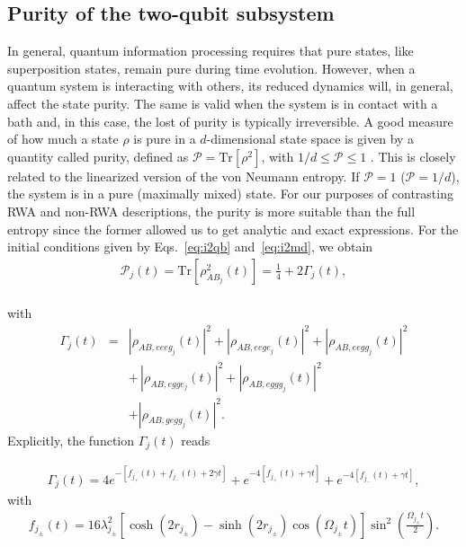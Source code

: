 \documentclass[%
reprint,
amsmath,amssymb,
aps,
pra,
]{revtex4-1}
\begin{document}
\subsection{\label{subsec:pur}Purity of the two-qubit subsystem}
In general, quantum information processing requires that pure states, like superposition states, remain pure during time evolution. However, when a quantum system is interacting with others, its reduced dynamics will, in general, affect the state purity. The same is valid when the system is in contact with a bath and, in this case, the lost of purity is typically irreversible.  A good measure of how much a state $\rho$ is pure in a $d$-dimensional  state space is given by a quantity called purity, defined as $\mathcal{P}=\text{Tr}\left[\rho^2\right]$, with $1/d\leq\mathcal{P}\leq1$ \cite{bar09}. This is closely related to the linearized version of the von Neumann entropy.  If $\mathcal{P}=1$ ($\mathcal{P}=1/d$), the system is in a pure (maximally mixed) state. For our purposes of contrasting RWA and non-RWA descriptions, the purity is more suitable than the full entropy since the former allowed us to get analytic and exact expressions. For the initial conditions given by Eqs.~\eqref{eq:i2qb} and~\eqref{eq:i2md}, we obtain 
\begin{eqnarray}
\mathcal{P}_{j}(t)=\text{Tr}\left[\rho_{AB_j}^2(t)\right]=\frac{1}{4}+2\Gamma_{j}(t),
\label{eq:purAB}
\end{eqnarray}\\
with 
\begin{eqnarray}
\Gamma_{j}(t)&=&\left|\rho_{AB,eeeg_j}(t)\right|^2+\left|\rho_{AB,eege_j}(t)\right|^2+\left|\rho_{AB,eegg_j}(t)\right|^2 \nonumber \\
&&+\,\left|\rho_{AB,egge_j}(t)\right|^2+\left|\rho_{AB,eggg_j}(t)\right|^2\nonumber\\ &&+\left|\rho_{AB,gegg_j}(t)\right|^2.
\label{eq:Gamma}
\end{eqnarray}
Explicitly, the function $\Gamma_{j}(t)$ reads 
\begin{widetext}
\begin{eqnarray}
\Gamma_{j}(t)=4e^{-\left[f_{j_+}(t)+f_{j_-}(t)+2\gamma t\right]}+e^{-4\left[f_{j_+}(t)+\gamma t\right]}+e^{-4\left[f_{j_-}(t)+\gamma t\right]},
\label{eq:Gamma1}
\end{eqnarray}
with
\begin{eqnarray}
f_{j_\pm}(t)=16\lambda_{j_\pm}^2\left[\cosh(2r_{j_\pm})-\sinh(2r_{j_\pm})\cos(\Omega_{j_\pm} t)\right]\sin ^2\left(\frac{\Omega_{j_\pm} t}{2}\right).
\label{eq:fj}
\end{eqnarray}
\end{widetext}
\end{document}
